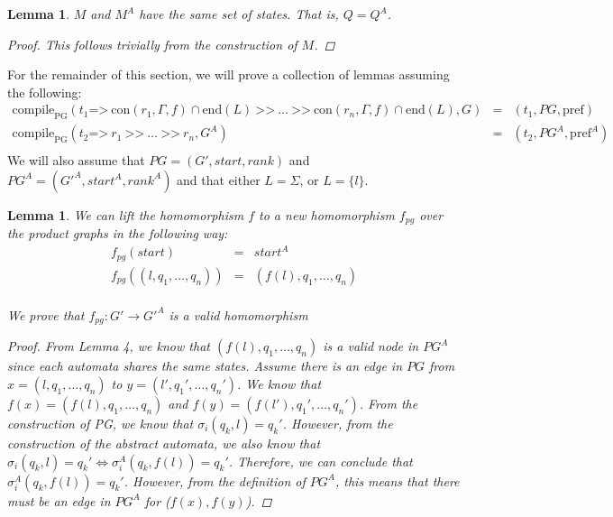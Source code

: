 \documentclass[twocolumn, openany]{sig-alternate-10pt}
\newcommand{\Prefer}{\texttt{>>}}
\newcommand{\Path}{\texttt{=>}}
\newcommand{\Con}{\mathrm{con}}
\newcommand{\CompilePg}{\ensuremath{\mathrm{compile}_\mathrm{PG}}}
\newcommand{\Pref}{\ensuremath{\mathrm{pref}}}
\newcommand{\EndR}{\ensuremath{\mathrm{end}}}
\newtheorem{lem}[thm]{Lemma}
\begin{document}
\begin{lem} $M$ and $M^A$ have the same set of states. That is, $Q = Q^A$.
    $ $
    \vspace{1em}
    \begin{proof}
      This follows trivially from the construction of $M$.
    \end{proof}
\end{lem}

\vspace{3em}
For the remainder of this section, we will prove a collection of lemmas assuming the following: 
%
\[
\begin{array}{lll}
  \CompilePg(t_1 \Path~ \Con(r_1,\Gamma,f) \cap \EndR(L) ~\Prefer~ \ldots ~\Prefer~ \Con(r_n,\Gamma,f) \cap \EndR(L), G) &=& (t_1, PG, \Pref) \\
  \CompilePg(t_2 \Path~ r_1 ~\Prefer~ \ldots ~\Prefer~ r_n, G^A) &=& (t_2, PG^A, \Pref^A) \\
\end{array}
\]
%
We will also assume that $PG = (G',start,rank)$ and $PG^A = (G'^A,start^A,rank^A)$ and that either $L = \Sigma$, or $L = \{ l \}$.

\vspace{3em}


\begin{lem}
  We can lift the homomorphism $f$ to a new homomorphism $f_{pg}$ over the product graphs in the following way:
  \[ \begin{array}{rcl}
    f_{pg}( start ) & = & start^A  \\
    f_{pg}( (l,q_1,\ldots,q_n) ) & = & (f(l),q_1,\ldots,q_n) \\
  \end{array} \]

  We prove that $f_{pg}: G' \rightarrow G'^A$ is a valid homomorphism
  \begin{proof}
    From Lemma 4, we know that $(f(l),q_1,\ldots,q_n)$ is a valid node in $PG^A$ since each automata
    shares the same states. Assume there is an edge in $PG$ from $x=(l,q_1,\ldots,q_n)$
    to $y=(l',q_1',\ldots,q_n')$. We know that $f(x) = (f(l),q_1,\ldots,q_n)$ and $f(y) = (f(l'),q_1',\ldots,q_n')$.
    From the construction of PG, we know that $\sigma_i(q_k, l) = q_k'$. However, from the construction of the abstract automata, we also know that $\sigma_i(q_k, l) = q_k' \iff \sigma^A_i(q_k, f(l)) = q_k'$. Therefore, we can conclude that $\sigma^A_i(q_k, f(l)) = q_k'$. However, from the definition of $PG^A$, this means that there must be an edge in $PG^A$ for ($f(x),f(y)$).
  \end{proof}
\end{lem}
\end{document}
